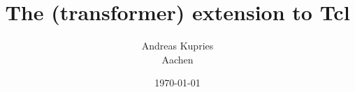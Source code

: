 \documentclass {report}
\begin{document}
\title{The \trf {} (transformer) extension to Tcl}
\author{Andreas Kupries \\ Aachen}
\date{\today}
\maketitle 

\printindex
\end{document}
